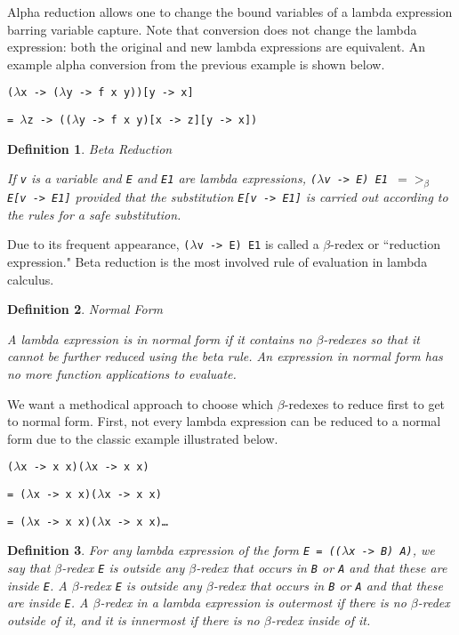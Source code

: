 \documentclass[11pt]{article}
\newtheorem{definition}{Definition}
\begin{document}
Alpha reduction allows one to change the bound variables of a lambda expression barring variable capture. Note that conversion does not change the lambda expression: both the original and new lambda expressions are equivalent. An example alpha conversion from the previous example is shown below.

\hspace{2cm}\texttt{($\lambda$x -> ($\lambda$y -> f x y))[y -> x]}\parskip 0pt

\hspace{2.5cm}\texttt{= $\lambda$z -> (($\lambda$y -> f x y)[x -> z][y -> x])}\parskip 6pt


\begin{definition}{Beta Reduction}

If \emph{\texttt{v}} is a variable and \emph{\texttt{E}} and \emph{\texttt{E1}} are lambda expressions, \emph{\texttt{($\lambda$v -> E) E1 $=>_{\beta}$ E[v -> E1]}} provided that the substitution \emph{\texttt{E[v -> E1]}} is carried out according to the rules for a safe substitution.
\end{definition}

Due to its frequent appearance, \texttt{($\lambda$v -> E) E1} is called a $\beta$-redex or ``reduction expression." Beta reduction is the most involved rule of evaluation in lambda calculus.


\begin{definition}{Normal Form}

A lambda expression is in normal form if it contains no $\beta$-redexes so that it cannot be further reduced using the beta rule. An expression in normal form has no more function applications to evaluate.
\end{definition}

We want a methodical approach to choose which $\beta$-redexes to reduce first to get to normal form. First, not every lambda expression can be reduced to a normal form due to the classic example illustrated below.

\hspace{2cm}\texttt{($\lambda$x -> x x)($\lambda$x -> x x)}\parskip 0pt

\hspace{2.5cm}\texttt{= ($\lambda$x -> x x)($\lambda$x -> x x)}\parskip 0pt

\hspace{2.5cm}\texttt{= ($\lambda$x -> x x)($\lambda$x -> x x)\ldots}\parskip 6pt

\begin{definition}

For any lambda expression of the form \emph{\texttt{E = (($\lambda$x -> B) A)}}, we say that $\beta$-redex \emph{\texttt{E}} is outside any $\beta$-redex that occurs in \emph{\texttt{B}} or \emph{\texttt{A}} and that these are inside \emph{\texttt{E}}. A $\beta$-redex \emph{\texttt{E}} is outside any $\beta$-redex that occurs in \emph{\texttt{B}} or \emph{\texttt{A}} and that these are inside \emph{\texttt{E}}. A $\beta$-redex in a lambda expression is outermost if there is no $\beta$-redex outside of it, and it is innermost if there is no $\beta$-redex inside of it.
\end{definition}
\end{document}
